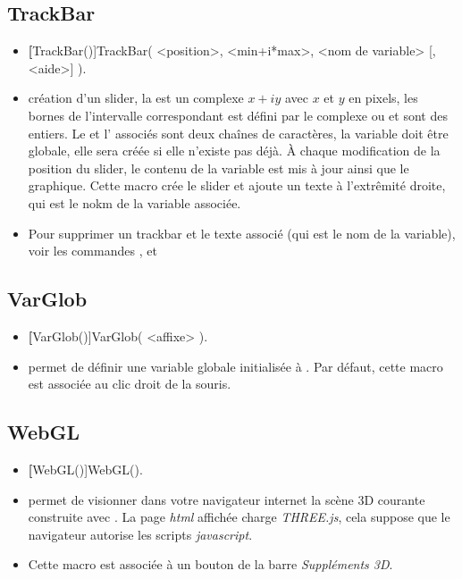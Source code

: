 \subsection{TrackBar}

\begin{itemize}
 \item \util \textbf[TrackBar()]{TrackBar( <position>, <min+i*max>, <nom de variable> [, <aide>] )}.
 \item \desc création d'un slider, la  est un complexe $x+iy$ avec $x$ et $y$ en pixels, les bornes de l'intervalle correspondant est défini par le complexe  ou  et  sont des entiers. Le  et l' associés sont deux chaînes de caractères, la variable doit être globale, elle sera créée si elle n'existe pas déjà. À chaque modification de la position du slider, le contenu de la variable est mis à jour ainsi que le graphique. Cette macro crée le slider et ajoute un texte à l'extrêmité droite, qui est le nokm de la variable associée.
 \item Pour supprimer un trackbar et le texte associé (qui est le nom de la variable), voir les commandes , et 

\end{itemize}


\subsection{VarGlob}

\begin{itemize}
 \item \util \textbf[VarGlob()]{VarGlob( <affixe> )}.
 \item \desc permet de définir une variable globale initialisée à . Par défaut, cette macro est associée au clic droit de la souris.
\end{itemize}

\subsection{WebGL}

\begin{itemize}
 \item \util \textbf[WebGL()]{WebGL()}.
 \item \desc permet de visionner dans votre navigateur internet la scène 3D courante construite avec . La page \textit{html} affichée charge \textit{THREE.js}, cela suppose que le navigateur autorise les scripts \textit{javascript}.
 \item Cette macro est associée à un bouton de la barre \textit{Suppléments 3D}.
\end{itemize}
 
